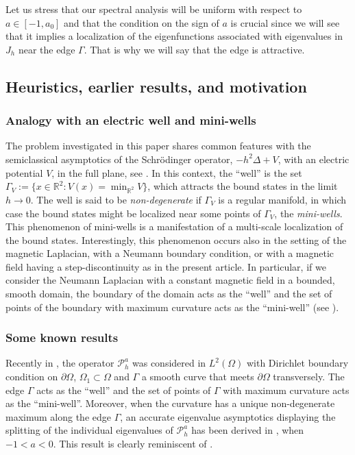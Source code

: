 \documentclass[10pt]{amsart}
\let\sep:
\newcommand{\cP}{\mathcal{P}}
\theoremstyle{plain}
\theoremstyle{definition}
\let\Subsection\subsection\let\Subsubsection\subsubsection
\begin{document}
Let us stress that our spectral analysis will be uniform with respect to $a\in[-1,a_0]$ and that the condition on the sign of $a$ is crucial since we will see that it implies a localization of the eigenfunctions associated with eigenvalues in $J_h$ near the edge $\Gamma$. That is why we will say that the edge is attractive.

\Subsection{Heuristics, earlier results, and motivation}
\subsubsection{Analogy with an electric well and mini-wells}
The problem investigated in this paper shares common features with the semiclassical asymptotics of the Schrödinger operator, $-h^2\Delta+V$, with an electric potential $V$, in the full plane, see \cite{HeSj,HeSj5,Simon, HS6}. In this context, the \enquote{well} is the set $\Gamma_V:=\{x\in\mathbb R^2\sep V(x)=\min_{\mathbb R^2} V\}$, which attracts the bound states in the limit $h\to0$. The well is said to be \emph{non-degenerate} if $\Gamma_V$ is a regular manifold, in which case the bound states might be localized near some points of $\Gamma_V$, the \emph{mini-wells}. This phenomenon of mini-wells is a manifestation of a multi-scale localization of the bound states. Interestingly, this phenomenon occurs also in the setting of the magnetic Laplacian, with a Neumann boundary condition, or with a magnetic field having a step-discontinuity as in the present article. In particular, if we consider the Neumann Laplacian with a constant magnetic field in a bounded, smooth domain, the boundary of the domain acts as the \enquote{well}
and the set of points of the boundary with maximum curvature acts as the \enquote{mini-well} (see \cite{HM01,FH06}).

\subsubsection{Some known results}
Recently in \cite{AHK, AK20}, the operator $\cP^a_h$ was considered in $L^2(\Omega)$ with Dirichlet boundary condition on $\partial \Omega$, $\Omega_1\subset \Omega$ and $\Gamma$ a smooth curve that meets $\partial\Omega$ transversely. The edge $\Gamma$ acts as the ``well'' and the set of points of $\Gamma$ with maximum curvature acts as the ``mini-well''.
Moreover, when the curvature has a unique non-degenerate maximum along the edge $\Gamma$, an accurate eigenvalue asymptotics displaying the splitting of the individual eigenvalues of $\cP^a_h$ has been derived in \cite[Th.\,1.2]{AHK}, when $-1<a<0$. This result is clearly reminiscent of \cite{FH06}.
\end{document}
